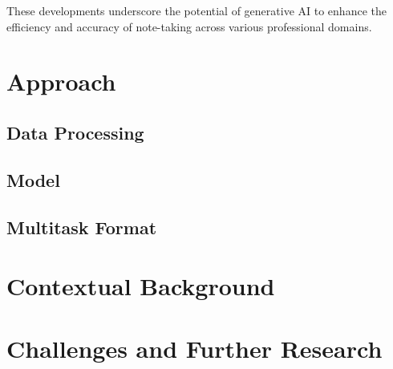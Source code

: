 \documentclass[12pt,a4paper]{article}
\begin{document}
These developments underscore the potential of generative AI to enhance the
efficiency and accuracy of note-taking across various professional domains.
\newpage


\section{Approach}

\subsection {Data Processing}

\subsection{Model}

\subsection{Multitask Format}

\newpage
\section{Contextual Background}

\newpage
\section{Challenges and Further Research}

\newpage
\nocite{*}



\end{document}
